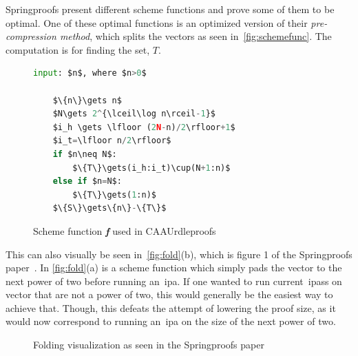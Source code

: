 Springproofs present different scheme functions and prove some of them to be optimal.
One of these optimal functions is an optimized version of their \textit{pre-compression method}, which splits the vectors as seen in~\autoref{fig:schemefunc}.
The computation is for finding the set, $T$.

\begin{figure}[ht]
\begin{framed}
    \begin{lstlisting}[language=Python,mathescape=true,label={lst:schemefunc}]
    input: $n$, where $n>0$

    $\{n\}\gets n$
    $N\gets 2^{\lceil\log n\rceil-1}$
    $i_h \gets \lfloor (2N-n)/2\rfloor+1$
    $i_t=\lfloor n/2\rfloor$
    if $n\neq N$:
        $\{T\}\gets(i_h:i_t)\cup(N+1:n)$
    else if $n=N$:
        $\{T\}\gets(1:n)$
    $\{S\}\gets\{n\}-\{T\}$
    \end{lstlisting}
\end{framed}
\caption{Scheme function \textbf{\textit{f}} used in CAAUrdleproofs}
\label{fig:schemefunc}
\end{figure}

This can also visually be seen in~\autoref{fig:fold}(b), which is figure 1 of the Springproofs paper~\cite{zhang2024springproofs}.
In \autoref{fig:fold}(a) is a scheme function which simply pads the vector to the next power of two before running an~\gls{ipa}.
If one wanted to run current~\glspl{ipa}s on vector that are not a power of two, this would generally be the easiest way to achieve that.
Though, this defeats the attempt of lowering the proof size, as it would now correspond to running an~\gls{ipa} on the size of the next power of two.

\begin{figure}[t]
    \centering
    \qquad
    \caption{Folding visualization as seen in the Springproofs paper}%
    \label{fig:fold}%
\end{figure}

